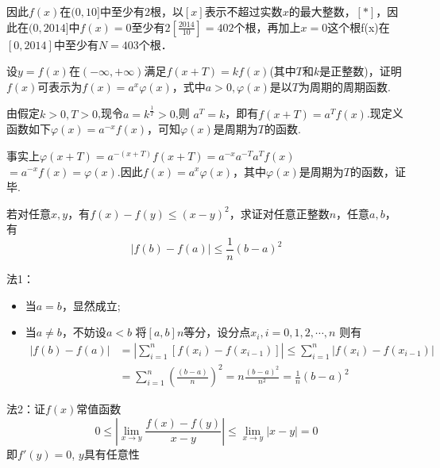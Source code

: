 \begin{xiti}
\begin{solution}
	因此$ f(x) $在$ (0,10] $中至少有$ 2 $根，以$ [x] $表示不超过实数$ x $的最大整数$ ，[*]， $因此在$ (0,2014] $中$ f(x)=0 $至少有$ 2[\frac{2014}{10}]=402 $个根，再加上$ x=0 $这个根f(x)在$ [0,2014] $中至少有$ N=403 $个根．
\end{solution}
\item 设$y=f(x)$在$(-\infty,+\infty)$满足$f(x+T)=kf(x)$(其中$T$和$k$是正整数)，证明$f(x)$可表示为$f ( x ) = a ^ { x } \varphi ( x )$，式中$a>0,\varphi(x)$是以$T$为周期的周期函数.

\begin{solution}
	由假定$k>0,T>0$,现令$a=k^{ \frac {1}{T}} >0$,则
	$a^{T}=k$，即有$f(x+T)=a^{T} f(x)$.现定义函数如下$\varphi(x)=a^{-x}f(x)$，可知$\varphi(x)$是周期为$T$的函数.
	
	事实上$\varphi(x+T)=a^{-(x+T)} f(x+T)=a^{-x} a^{-T} a^{T} f(x)$
	$=a^{-x} f(x)=\varphi(x)$.因此$f(x)=a^{x} \varphi(x)$，其中$\varphi(x)$是周期为$T$的函数，证毕.
\end{solution}
\item 若对任意$x,y$，有$f ( x ) - f ( y ) \leqslant ( x - y ) ^ { 2 }$，求证对任意正整数$n$，任意$a,b$，有
\[| f ( b ) - f ( a ) | \leqslant \frac { 1 } { n } ( b - a ) ^ { 2 }\]
\begin{solution}
	法1：
	\begin{itemize}
		\item 当$a=b$，显然成立;
		\item 当$a\ne b$，不妨设$a<b$
		将$[a,b]n$等分，设分点$x_i, i=0,1,2,\cdots ,n$
		则有
		\begin{equation*}
		\begin{aligned}
		|f(b)-f(a)|&=|\sum_{i=1}^{n} [f(x_i)-f(x_{i-1})]|\leq \sum_{i=1}^{n} |f(x_i)-f(x_{i-1})|\\
		&=\sum_{i=1}^{n} (\frac{(b-a)}{n})^2=n\frac{(b-a)^2}{n^2}=\frac{1}{n}(b-a)^2
		\end{aligned}
		\end{equation*}
	\end{itemize}

	法2：证$f(x)$常值函数
	$$0 \leq |\lim_{x \rightarrow y}\frac{f(x)-f(y)}{x-y}|\leq \lim_{x \rightarrow y}|x-y|=0$$
	即$f'(y)=0$, $ y$具有任意性
\end{solution}
\end{xiti}

